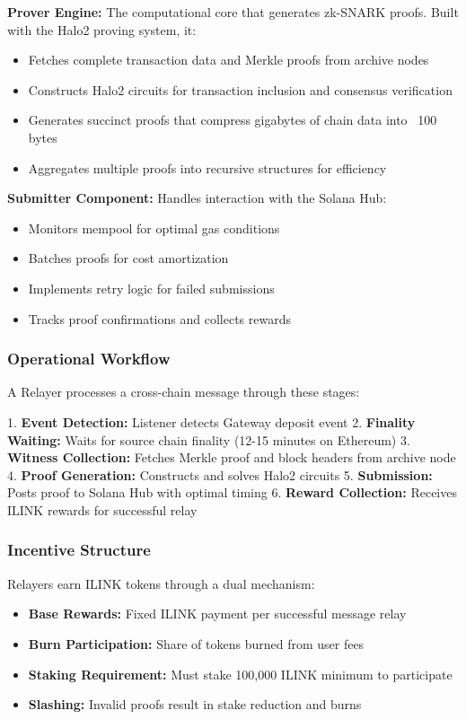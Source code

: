 \documentclass[11pt,a4paper]{article}
\begin{document}
\textbf{Prover Engine:} The computational core that generates zk-SNARK proofs. Built with the Halo2 proving system, it:
\begin{itemize}
    \item Fetches complete transaction data and Merkle proofs from archive nodes
    \item Constructs Halo2 circuits for transaction inclusion and consensus verification
    \item Generates succinct proofs that compress gigabytes of chain data into ~100 bytes
    \item Aggregates multiple proofs into recursive structures for efficiency
\end{itemize}

\textbf{Submitter Component:} Handles interaction with the Solana Hub:
\begin{itemize}
    \item Monitors mempool for optimal gas conditions
    \item Batches proofs for cost amortization
    \item Implements retry logic for failed submissions
    \item Tracks proof confirmations and collects rewards
\end{itemize}

\subsubsection*{Operational Workflow}

A Relayer processes a cross-chain message through these stages:

1. \textbf{Event Detection:} Listener detects Gateway deposit event
2. \textbf{Finality Waiting:} Waits for source chain finality (12-15 minutes on Ethereum)
3. \textbf{Witness Collection:} Fetches Merkle proof and block headers from archive node
4. \textbf{Proof Generation:} Constructs and solves Halo2 circuits
5. \textbf{Submission:} Posts proof to Solana Hub with optimal timing
6. \textbf{Reward Collection:} Receives ILINK rewards for successful relay

\subsubsection*{Incentive Structure}

Relayers earn ILINK tokens through a dual mechanism:
\begin{itemize}
    \item \textbf{Base Rewards:} Fixed ILINK payment per successful message relay
    \item \textbf{Burn Participation:} Share of tokens burned from user fees
    \item \textbf{Staking Requirement:} Must stake 100,000 ILINK minimum to participate
    \item \textbf{Slashing:} Invalid proofs result in stake reduction and burns
\end{itemize}
\end{document}
